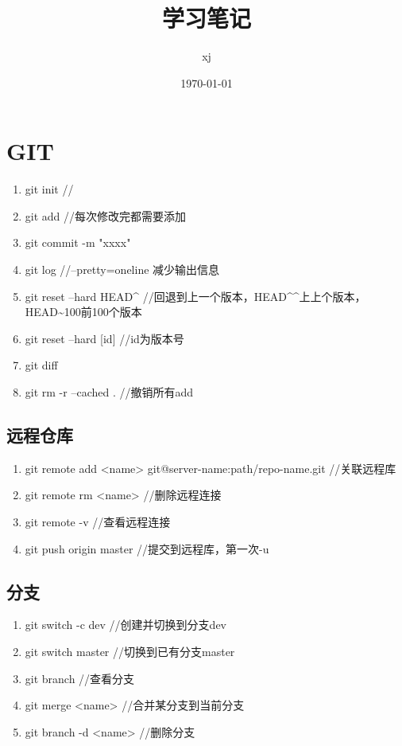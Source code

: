 \documentclass[fontset=windows]{article}
\title{学习笔记}
\author{xj}
\date{\today}
\begin{document}
\maketitle

\section{GIT}
\begin{enumerate}
    \item git init //
    \item git add  //每次修改完都需要添加
    \item git commit -m "xxxx"
    \item git log //--pretty=oneline 减少输出信息
    \item git reset --hard HEAD\^{} //回退到上一个版本，HEAD\^{}\^{}上上个版本，HEAD\~{}100前100个版本
    \item git reset --hard [id]  //id为版本号
    \item git diff 
    \item git rm -r --cached . //撤销所有add

\end{enumerate}

\subsection{远程仓库}
\begin{enumerate}
    \item git remote add <name> git@server-name:path/repo-name.git //关联远程库
    \item git remote rm <name> //删除远程连接
    \item git remote -v //查看远程连接
    \item git push origin master //提交到远程库，第一次-u
\end{enumerate}

\subsection{分支}
\begin{enumerate}
    \item git switch -c dev //创建并切换到分支dev
    \item git switch master //切换到已有分支master
    \item git branch //查看分支
    \item git merge <name> //合并某分支到当前分支
    \item git branch -d <name> //删除分支
\end{enumerate}
\end{document}
